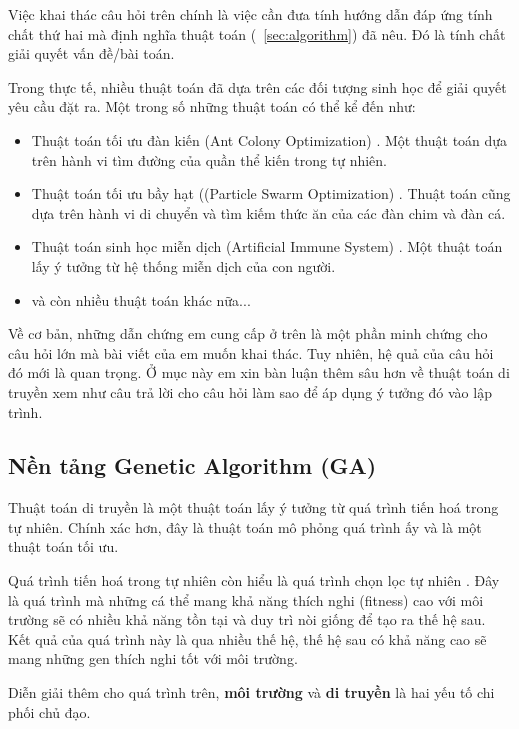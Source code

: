 Việc khai thác câu hỏi trên chính là việc cần đưa tính hướng dẫn đáp ứng tính chất thứ hai mà định nghĩa thuật toán (~\ref{sec:algorithm}) đã nêu. Đó là tính chất giải quyết vấn đề/bài toán.

Trong thực tế, nhiều thuật toán đã dựa trên các đối tượng sinh học để giải quyết yêu cầu đặt ra. Một trong số những thuật toán có thể kể đến như:
\begin{itemize}
	\item Thuật toán tối ưu đàn kiến (Ant Colony Optimization) \cite{AntColony}. Một thuật toán dựa trên hành vi tìm đường của quần thể kiến trong tự nhiên.
	
	\item Thuật toán tối ưu bầy hạt ((Particle Swarm Optimization) \cite{PSO}. Thuật toán cũng dựa trên hành vi di chuyển và tìm kiếm thức ăn của các đàn chim và đàn cá.
	
	\item Thuật toán sinh học miễn dịch (Artificial Immune System) \cite{AIS1} \cite{AIS2}. Một thuật toán lấy ý tưởng từ hệ thống miễn dịch của con người.
	
	\item và còn nhiều thuật toán khác nữa...
\end{itemize}

Về cơ bản, những dẫn chứng em cung cấp ở trên là một phần minh chứng cho câu hỏi lớn mà bài viết của em muốn khai thác. Tuy nhiên, hệ quả của câu hỏi đó mới là quan trọng. Ở mục này em xin bàn luận thêm sâu hơn về thuật toán di truyền xem như câu trả lời cho câu hỏi làm sao để áp dụng ý tưởng đó vào lập trình.

\subsection{Nền tảng Genetic Algorithm (GA)}
Thuật toán di truyền là một thuật toán lấy ý tưởng từ quá trình tiến hoá trong tự nhiên. Chính xác hơn, đây là thuật toán mô phỏng quá trình ấy và là một thuật toán tối ưu.

Quá trình tiến hoá trong tự nhiên còn hiểu là quá trình chọn lọc tự nhiên \cite{NaturalSelection}. Đây là quá trình mà những cá thể mang khả năng thích nghi (fitness) cao với môi trường sẽ có nhiều khả năng tồn tại và duy trì nòi giống để tạo ra thế hệ sau. Kết quả của quá trình này là qua nhiều thế hệ, thế hệ sau có khả năng cao sẽ mang những gen thích nghi tốt với môi trường.

Diễn giải thêm cho quá trình trên, \textbf{môi trường} và \textbf{di truyền} là hai yếu tố chi phối chủ đạo.

